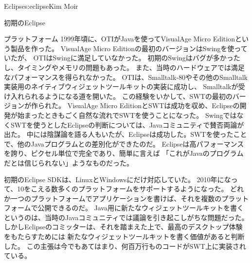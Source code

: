 \begin{aosachapter}{Eclipse}{s:eclipse}{Kim Moir}
\begin{aosasect1}{初期のEclipse}
\begin{aosasect2}{プラットフォーム}
1999年頃に、OTIがJavaを使ってVisualAge Micro Editionという製品を作った。
VisualAge Micro Editionの最初のバージョンはSwingを使っていたが、
OTIはSwingに満足していなかった。
初期のSwingはバグが多かったし、タイミングやメモリの問題もあった。
また、当時のハードウェアでは満足なパフォーマンスを得られなかった。
OTIは、Smalltalk-80やその他のSmalltalk実装用のネイティブウィジェットツールキットの実装に成功し、
Smalltalkが受け入れられるようになる道を開いた。
この経験をいかして、SWTの最初のバージョンが作られた。
VisualAge Micro EditionとSWTは成功を収め、Eclipseの開発が始まったときもごく自然な流れでSWTを使うことになった。
SwingではなくSWTを使うとしたEclipseの判断については、Javaコミュニティで賛否両論が出た。
中には陰謀論を語る人もいたが、Eclipseは成功した。SWTを使ったことで、他のJavaプログラムとの差別化ができたのだ。
Eclipseは高パフォーマンスを誇り、ピクセル単位で完全であり、簡単に言えば
「これがJavaのプログラムだとは信じられない」ようなものだった。

初期のEclipse SDKは、LinuxとWindowsにだけ対応していた。
2010年になって、10をこえる数多くのプラットフォームをサポートするようになった。
どれか一つのプラットフォームでアプリケーションを書けば、それを複数のプラットフォームで公開できるのだ。
Java用に新たなウィジェットツールキットを書くというのは、当時のJavaコミュニティでは議論を引き起こしがちな問題だった。
しかしEclipseのコミッターは、それを踏まえた上で、最高のデスクトップ体験をもたらすためには
新たなウィジェットツールキットを書く価値があると判断した。
この主張は今でもあてはまり、何百万行ものコードがSWT上に実装されている。


\end{aosasect2}
\end{aosasect1}
\end{aosachapter}

